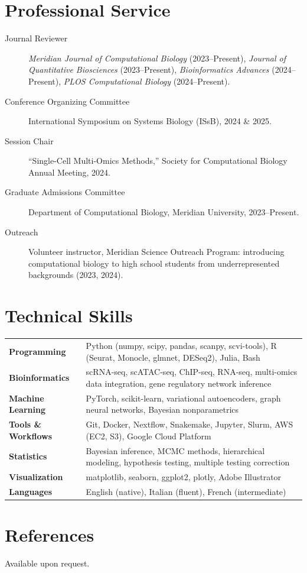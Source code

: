 \documentclass[11pt,a4paper]{article}
\begin{document}
\section{Professional Service}

\begin{description}
  \item[Journal Reviewer] \textit{Meridian Journal of Computational Biology} (2023--Present), \textit{Journal of Quantitative Biosciences} (2023--Present), \textit{Bioinformatics Advances} (2024--Present), \textit{PLOS Computational Biology} (2024--Present).

  \item[Conference Organizing Committee] International Symposium on Systems Biology (IS\lowercase{s}B), 2024 \& 2025.

  \item[Session Chair] ``Single-Cell Multi-Omics Methods,'' Society for Computational Biology Annual Meeting, 2024.

  \item[Graduate Admissions Committee] Department of Computational Biology, Meridian University, 2023--Present.

  \item[Outreach] Volunteer instructor, Meridian Science Outreach Program: introducing computational biology to high school students from underrepresented backgrounds (2023, 2024).
\end{description}

\section{Technical Skills}

{\small
\begin{tabularx}{\textwidth}{L{0.22\textwidth} L{0.78\textwidth}}
\textbf{Programming}       & Python (numpy, scipy, pandas, scanpy, scvi-tools), R (Seurat, Monocle, glmnet, DESeq2), Julia, Bash \\
\textbf{Bioinformatics}    & scRNA-seq, scATAC-seq, ChIP-seq, RNA-seq, multi-omics data integration, gene regulatory network inference \\
\textbf{Machine Learning}  & PyTorch, scikit-learn, variational autoencoders, graph neural networks, Bayesian nonparametrics \\
\textbf{Tools \& Workflows}& Git, Docker, Nextflow, Snakemake, Jupyter, Slurm, AWS (EC2, S3), Google Cloud Platform \\
\textbf{Statistics}        & Bayesian inference, MCMC methods, hierarchical modeling, hypothesis testing, multiple testing correction \\
\textbf{Visualization}     & matplotlib, seaborn, ggplot2, plotly, Adobe Illustrator \\
\textbf{Languages}         & English (native), Italian (fluent), French (intermediate)\\
\end{tabularx}
}

\section{References}

Available upon request.

\vfill
\end{document}
